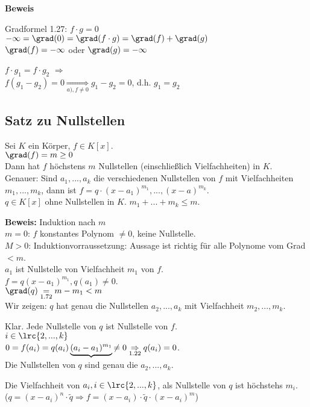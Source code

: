 	\textbf{Beweis}
	\item Gradformel 1.27: $f\cdot g=0$\\
	$-\infty=\grad(0)=\grad(f\cdot g)=\grad(f)+\grad(g)$\\
$	\grad(f)=-\infty$ oder $\grad(g)=-\infty$
\item $f\cdot g_1=f\cdot g_2$ $\Rightarrow$\\
$f(g_1-g_2)=0\underset{\scriptstyle{a),f\neq 0}}{\Rightarrow} g_1-g_2=0$, d.h. $g_1=g_2$
	\subExEnd
	
	\subsection{Satz zu Nullstellen}
	
	Sei $K$ ein Körper, $f\in K[x]$.\\
	$\grad(f)=m\geq 0$\\
	Dann hat $f$ höchstens $m$ Nullstellen (einschließlich Vielfachheiten) in $K$.\\
	Genauer: Sind $a_1,...,a_k$ die verschiedenen Nullstellen von $f$ mit Vielfachheiten $m_1,...,m_k$, dann ist $f=q\cdot(x-a_1)^{m_1},...,(x-a)^{m_k}$.\\
	$q\in K[x]$ ohne Nullstellen in $K$. $m_1+...+m_k\leq m$.
	
	\textbf{Beweis:} Induktion nach $m$\\
	$m=0$: $f$ konstantes Polynom $\neq 0$, keine Nullstelle.\\
	$M>0$: Induktionvorraussetzung: Aussage ist richtig für alle Polynome vom Grad $<m$.\\
	$a_1$ ist Nullstelle von Vielfachheit $m_1$ von $f$.\\
	$f=q(x-a_1)^{m_1},q(a_1)\neq 0$.\\
	$\grad(q)\underset{\mbox{\scriptsize 1.72}}{=}m-m_1<m$\\
	Wir zeigen: $q$ hat genau die Nullstellen $a_2,...,a_k$ mit Vielfachheit $m_2,...,m_k$.
	
	Klar. Jede Nullstelle von $q$ ist Nullstelle von $f$.\\
	$i\in\lrc{2,...,k}$\\
	$0=f(a_i)=q(a_i)\underbrace{(a_i-a_1)^{m_1}}{\neq 0}\underset{\mbox{\scriptsize 1.22}}{\Rightarrow} q(a_i)=0$.\\
	Die Nullstellen von $q$ sind genau die $a_2,...,a_k$.
	
	Die Vielfachheit von $a_i,i\in\lrc{2,...,k}$, als Nullstelle von $q$ ist höchstehs $m_i$.\\
	($q=(x-a_i)^n\cdot\tilde{q}\Rightarrow f=(x-a_i)\cdot\tilde{q}\cdot(x-a_i)^m$)
	
